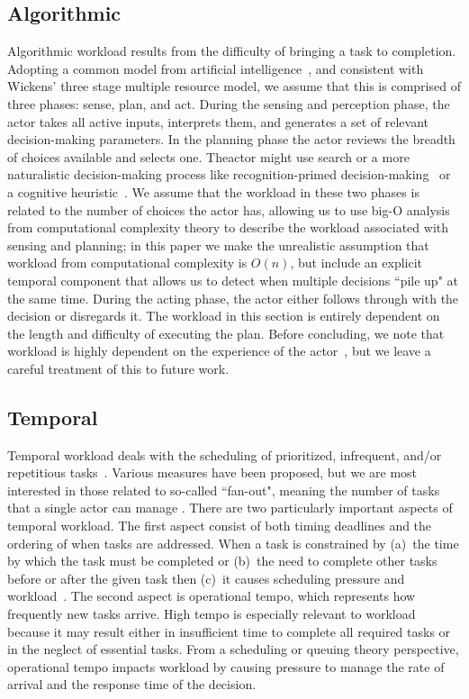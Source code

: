 \subsection{Algorithmic}
Algorithmic workload results from the difficulty of bringing a task to completion. Adopting a common model from artificial intelligence~\cite{Murphy00}, and consistent with Wickens' three stage multiple resource model, we assume that this is comprised of three phases: sense, plan, and act. During the sensing and perception phase, the actor takes all active inputs, interprets them, and generates a set of relevant decision-making parameters. In the planning phase the actor reviews the breadth of choices available and selects one. Theactor might use search or a more naturalistic decision-making process like recognition-primed decision-making~\cite{ZsambokKlein97} or a cognitive heuristic~\cite{GigerenzerTodd99}. We assume that the workload in these two phases is related to the number of choices the actor has, allowing us to use big-O analysis from computational complexity theory to describe the workload associated with sensing and planning; in this paper we make the unrealistic assumption that workload from computational complexity is $O(n)$, but include an explicit temporal component that allows us to detect when multiple decisions ``pile up" at the same time. During the acting phase, the actor either follows through with the decision or disregards it. The workload in this section is entirely dependent on the length and difficulty of executing the plan. Before concluding, we note that workload is highly dependent on the experience of the actor~\cite{ZsambokKlein97}, but we leave a careful treatment of this to future work.


\subsection{Temporal}
Temporal workload deals with the scheduling of prioritized, infrequent, and/or repetitious tasks~\cite{DessoukyEtAl95,MorayEtAl91}. Various measures have been proposed, but we are most interested in those related to so-called ``fan-out", meaning the number of tasks that a single actor can manage \cite{Goodrich2010,OlsenWood2004,CrandallEtAl2005,Cummings2007}. There are two particularly important aspects of temporal workload. The first aspect consist of both timing deadlines and the ordering of when tasks are addressed. When a task is constrained by (a)~the time by which the task must be completed or (b)~the need to complete other tasks before or after the given task then (c)~it causes scheduling pressure and workload~\cite{MauDolan2006}. The second aspect is operational tempo, which represents how frequently new tasks arrive. High tempo is especially relevant to workload because it may result either in insufficient time to complete all required tasks or in the neglect of essential tasks.  From a scheduling or queuing theory perspective, operational tempo impacts workload by causing pressure to manage the rate of arrival and the response time of the decision.


